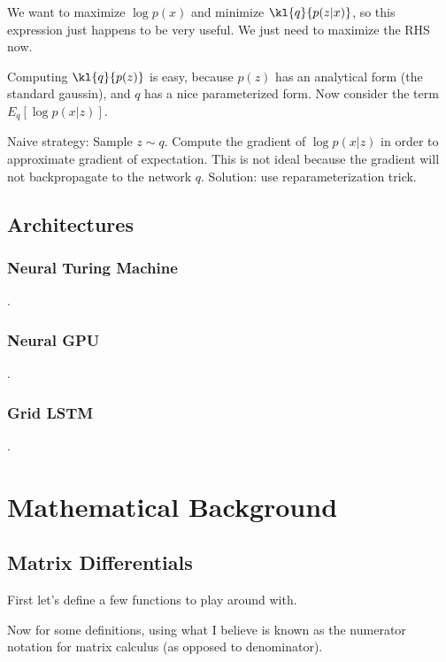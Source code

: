 \documentclass[12pt]{article}
\begin{document}
We want to maximize $\log p(x)$ and minimize $\kl{q}{p(z|x)}$, so this expression just happens to be very useful. We just need to maximize the RHS now.

Computing $\kl{q}{p(z)}$ is easy, because $p(z)$ has an analytical form (the standard gaussin), and $q$ has a nice parameterized form. Now consider the term $E_q[\log p(x|z)]$. 

Naive strategy: Sample $z \sim q$. Compute the gradient of $\log p(x|z)$ in order to approximate gradient of expectation. This is not ideal because the gradient will not backpropagate to the network $q$. Solution: use reparameterization trick.  

\subsection{Architectures}

\subsubsection{Neural Turing Machine}
.
\subsubsection{Neural GPU}
.
\subsubsection{Grid LSTM}
.
\section{Mathematical Background}

\subsection{Matrix Differentials}

First let's define a few functions to play around with.


Now for some definitions, using what I believe is known as the numerator notation for matrix calculus (as opposed to denominator).

\end{document}
